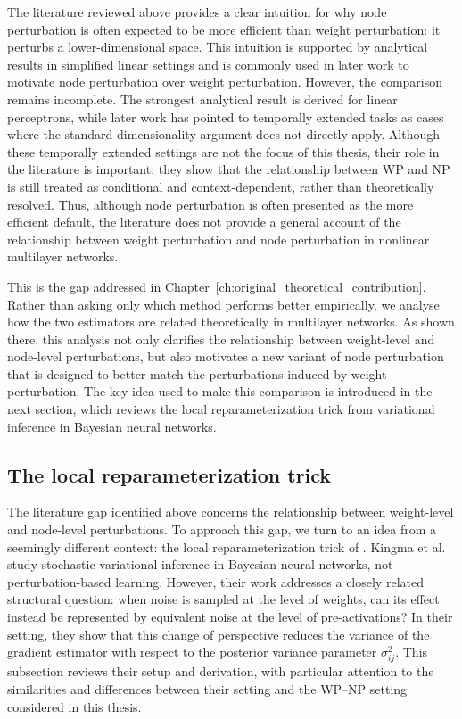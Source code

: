 The literature reviewed above provides a clear intuition for why node perturbation is often expected to be more efficient than weight perturbation: it perturbs a lower-dimensional space. This intuition is supported by analytical results in simplified linear settings and is commonly used in later work to motivate node perturbation over weight perturbation. However, the comparison remains incomplete. The strongest analytical result is derived for linear perceptrons, while later work has pointed to temporally extended tasks as cases where the standard dimensionality argument does not directly apply. Although these temporally extended settings are not the focus of this thesis, their role in the literature is important: they show that the relationship between WP and NP is still treated as conditional and context-dependent, rather than theoretically resolved. Thus, although node perturbation is often presented as the more efficient default, the literature does not provide a general account of the relationship between weight perturbation and node perturbation in nonlinear multilayer networks.

This is the gap addressed in Chapter~\ref{ch:original_theoretical_contribution}. Rather than asking only which method performs better empirically, we analyse how the two estimators are related theoretically in multilayer networks. As shown there, this analysis not only clarifies the relationship between weight-level and node-level perturbations, but also motivates a new variant of node perturbation that is designed to better match the perturbations induced by weight perturbation. The key idea used to make this comparison is introduced in the next section, which reviews the local reparameterization trick from variational inference in Bayesian neural networks.

\subsection{The local reparameterization trick}
\label{sec:local-reparameterization-trick}

The literature gap identified above concerns the relationship between weight-level and node-level perturbations. To approach this gap, we turn to an idea from a seemingly different context: the local reparameterization trick of \textcite{kingma_variational_2015}. Kingma et al. study stochastic variational inference in Bayesian neural networks, not perturbation-based learning. However, their work addresses a closely related structural question: when noise is sampled at the level of weights, can its effect instead be represented by equivalent noise at the level of pre-activations? In their setting, they show that this change of perspective reduces the variance of the gradient estimator with respect to the posterior variance parameter \(\sigma_{ij}^{2}\). This subsection reviews their setup and derivation, with particular attention to the similarities and differences between their setting and the WP--NP setting considered in this thesis.

